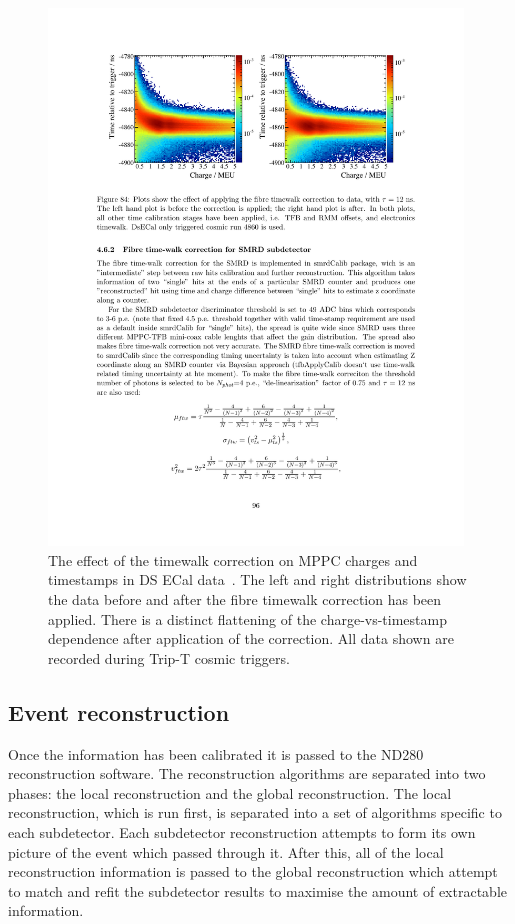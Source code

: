 \begin{figure}[t!]
  \centering
  \includegraphics[width=11cm]{images/software/Fibre_Timewalk_Correction_DSECal.pdf}
  \caption{The effect of the timewalk correction on MPPC charges and timestamps in DS ECal data~\cite{ND280CalibTN}.  The left and right distributions show the data before and after the fibre timewalk correction has been applied.  There is a distinct flattening of the charge-vs-timestamp dependence after application of the correction.  All data shown are recorded during Trip-T cosmic triggers.}
  \label{fig:FibreTimewalkCorrectionDSECal}
\end{figure}
\subsection{Event reconstruction}
\label{subsec:EventReconstruction}
Once the information has been calibrated it is passed to the ND280 reconstruction software.  The reconstruction algorithms are separated into two phases: the local reconstruction and the global reconstruction.  The local reconstruction, which is run first, is separated into a set of algorithms specific to each subdetector.  Each subdetector reconstruction attempts to form its own picture of the event which passed through it.  After this, all of the local reconstruction information is passed to the global reconstruction which attempt to match and refit the subdetector results to maximise the amount of extractable information.

